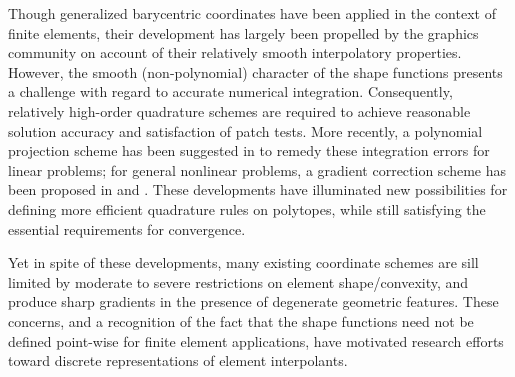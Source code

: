 		Though generalized barycentric coordinates have been applied in the context of finite elements, their development has largely been propelled by the graphics community on account of their relatively smooth interpolatory properties. However, the smooth (non-polynomial) character of the shape functions presents a challenge with regard to accurate numerical integration. Consequently, relatively high-order quadrature schemes are required to achieve reasonable solution accuracy and satisfaction of patch tests. More recently, a polynomial projection scheme has been suggested in \cite{Talischi:14} to remedy these integration errors for linear problems; for general nonlinear problems, a gradient correction scheme has been proposed in \cite{Talischi:15} and \cite{Chi:16}. These developments have illuminated new possibilities for defining more efficient quadrature rules on polytopes, while still satisfying the essential requirements for convergence.
		
		Yet in spite of these developments, many existing coordinate schemes are sill limited by moderate to severe restrictions on element shape/convexity, and produce sharp gradients in the presence of degenerate geometric features. These concerns, and a recognition of the fact that the shape functions need not be defined point-wise for finite element applications, have motivated research efforts toward discrete representations of element interpolants.

